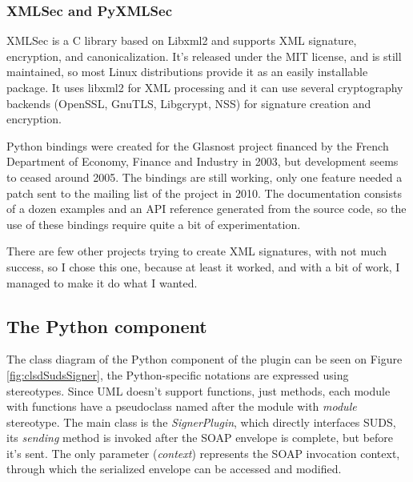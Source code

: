 \subsubsection{XMLSec and PyXMLSec}

XMLSec is a C library based on Libxml2 and supports XML signature, encryption, and canonicalization.\cite{xmlsec-homepage} It's released under the MIT license, and is still maintained, so most Linux distributions provide it as an easily installable package. It uses libxml2 for XML processing and it can use several cryptography backends (OpenSSL, GnuTLS, Libgcrypt, NSS) for signature creation and encryption.

Python bindings were created for the Glasnost project financed by the French Department of Economy, Finance and Industry in 2003, but development seems to ceased around 2005. The bindings are still working, only one feature needed a patch sent to the mailing list of the project in 2010. The documentation consists of a dozen examples and an API reference generated from the source code, so the use of these bindings require quite a bit of experimentation.

There are few other projects trying to create XML signatures, with not much success, so I chose this one, because at least it worked, and with a bit of work, I managed to make it do what I wanted.

\subsection{The Python component}

The class diagram of the Python component of the plugin can be seen on Figure \ref{fig:clsdSudsSigner}, the Python-specific notations are expressed using stereotypes. Since UML doesn't support functions, just methods, each module with functions have a pseudoclass named after the module with \emph{module} stereotype. The main class is the \emph{SignerPlugin}, which directly interfaces SUDS, its \emph{sending} method is invoked after the SOAP envelope is complete, but before it's sent. The only parameter (\emph{context}) represents the SOAP invocation context, through which the serialized envelope can be accessed and modified.

